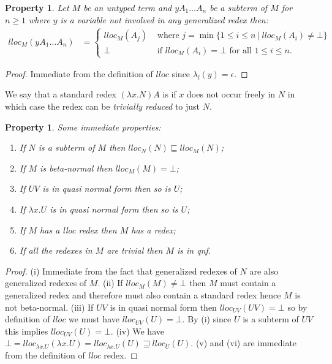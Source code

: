 \documentclass{elsarticle}
\theoremstyle{plain}
\newtheorem{property}[theorem]{Property}
\theoremstyle{definition}
\theoremstyle{remark}
\begin{document}
\begin{property}
\label{prop:qnf_longapply}
    Let $M$ be an untyped term and $y A_1 \ldots A_n$ be a subterm of $M$ for $n\geq1$ where $y$ is a variable not involved in any generalized redex then:
    \begin{align*}
    lloc_M(y A_1 \ldots A_n) &=
        \begin{cases}
         lloc_M (A_j) &\mbox{ where } j = \min \{ 1\leq i\leq n \ | \ lloc_M (A_i) \neq \bot\} \\
         \bot &\mbox{ if } lloc_M(A_i) = \bot \mbox{ for all } 1\leq i\leq n.
        \end{cases}
    \end{align*}
\end{property}
\begin{proof}
    Immediate from the definition of $lloc$ since $\lambda_l(y) = \epsilon$.
\end{proof}

We say that a standard redex $(\lambda x. N) A$ is  if $x$ does not occur freely in $N$ in which case the redex can be \emph{trivially reduced} to just $N$.

\begin{property}
\label{prop:lloc_properties}
Some immediate properties:
\begin{enumerate}[noitemsep,label=(\roman*)]
\item
 If $N$ is a subterm of $M$ then $lloc_N(N) \sqsubseteq lloc_M(N)$;
\item
 If $M$ is beta-normal then $lloc_M(M) = \bot$;
 \item
 If $U V$ is in quasi normal form then so is $U$;
\item
 If $\lambda x . U$ is in quasi normal form then so is $U$;
 \item If $M$ has a \emph{lloc} redex then $M$ has a redex;
 \item If all the redexes in $M$ are trivial then $M$ is in \emph{qnf}.
\end{enumerate}
\end{property}
\begin{proof}
(i) Immediate from the fact that generalized redexes of $N$ are also generalized redexes of $M$. (ii) If $lloc_M(M) \neq \bot$ then $M$ must contain a generalized redex and therefore must also contain a standard redex hence $M$ is not beta-normal.
(iii) If $U V$ is in quasi normal form then $lloc_{UV}(UV) = \bot$ so by definition of $lloc$ we must have $lloc_{UV}(U) = \bot$. By (i) since $U$ is a subterm of $UV$ this implies $lloc_{UV}(U) = \bot$.
(iv) We have $\bot = lloc_{\lambda x . U}(\lambda x . U) = lloc_{\lambda x . U}(U) \sqsupseteq lloc_{U}(U)$.
(v) and (vi) are immediate from the definition of \emph{lloc} redex.
\end{proof}
\end{document}
